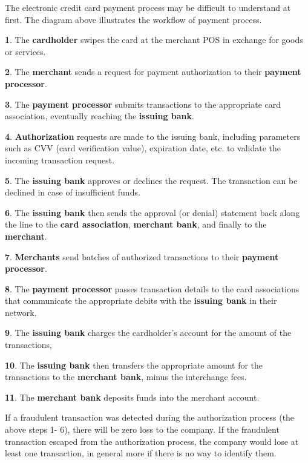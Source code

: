 \documentclass[
]{book}
\begin{document}
The electronic credit card payment process may be difficult to understand at first. The diagram above illustrates the workflow of payment process.

\textbf{\color{red}1}. The \textbf{cardholder} swipes the card at the merchant POS in exchange for goods or services.

\textbf{\color{red}2}. The \textbf{merchant} sends a request for payment authorization to their \textbf{payment processor}.

\textbf{\color{red}3}. The \textbf{payment processor} submits transactions to the appropriate card association, eventually reaching the \textbf{issuing bank}.

\textbf{\color{red}4}. \textbf{Authorization} requests are made to the issuing bank, including parameters such as CVV (card verification value), expiration date, etc. to validate the incoming transaction request.

\textbf{\color{red}5}. The \textbf{issuing bank} approves or declines the request. The transaction can be declined in case of insufficient funds.

\textbf{\color{red}6}. The \textbf{issuing bank} then sends the approval (or denial) statement back along the line to the \textbf{card association}, \textbf{merchant bank}, and finally to the \textbf{merchant}.

\textbf{\color{blue}7}. \textbf{Merchants} send batches of authorized transactions to their \textbf{payment processor}.

\textbf{\color{blue}8}. The \textbf{payment processor} passes transaction details to the card associations that communicate the appropriate debits with the \textbf{issuing bank} in their network.

\textbf{\color{blue}9}. The \textbf{issuing bank} charges the cardholder's account for the amount of the transactions,

\textbf{\color{blue}10}. The \textbf{issuing bank} then transfers the appropriate amount for the transactions to the \textbf{merchant bank}, minus the interchange fees.

\textbf{\color{blue}11}. The \textbf{merchant bank} deposits funds into the merchant account.

If a fraudulent transaction was detected during the authorization process (the above steps 1- 6), there will be zero loss to the company. If the fraudulent transaction escaped from the authorization process, the company would lose at least one transaction, in general more if there is no way to identify them.
\end{document}
